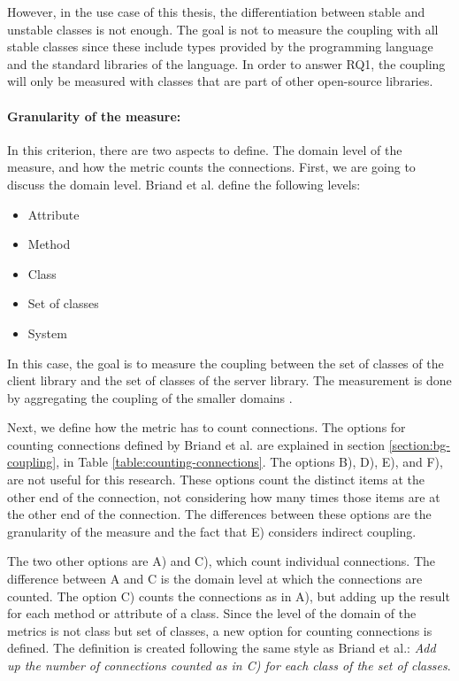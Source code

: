 However, in the use case of this thesis, the differentiation between stable and unstable classes is not enough. The goal is not to measure the coupling with all stable classes since these include types provided by the programming language and the standard libraries of the language. In order to answer RQ1, the coupling will only be measured with classes that are part of other open-source libraries.

\paragraph{Granularity of the measure:}
In this criterion, there are two aspects to define. The domain level of the measure, and how the metric counts the connections. First, we are going to discuss the domain level. Briand et al. define the following levels:

\begin{itemize}[noitemsep]
  \renewcommand\labelitemi{--}
  \item Attribute
  \item Method
  \item Class
  \item Set of classes
  \item System
\end{itemize}

\blankls
In this case, the goal is to measure the coupling between the set of classes of the client library and the set of classes of the server library. The measurement is done by aggregating the coupling of the smaller domains \cite{briand1999unified}.

Next, we define how the metric has to count connections. The options for counting connections defined by Briand et al. are explained in section \ref{section:bg-coupling}, in Table \ref{table:counting-connections}. The options B), D), E), and F), are not useful for this research. These options count the distinct items at the other end of the connection, not considering how many times those items are at the other end of the connection. The differences between these options are the granularity of the measure and the fact that E) considers indirect coupling.

The two other options are A) and C), which count individual connections. The difference between A and C is the domain level at which the connections are counted. The option C) counts the connections as in A), but adding up the result for each method or attribute of a class. Since the level of the domain of the metrics is not class but set of classes, a new option for counting connections is defined. The definition is created following the same style as Briand et al.: \textit{Add up the number of connections counted as in C) for each class of the set of classes}.

